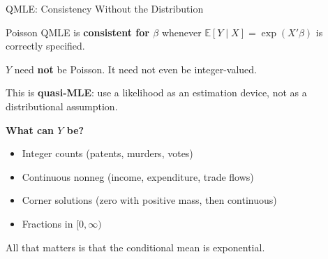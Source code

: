 \documentclass[aspectratio=169, handout, t]{beamer}
\numberwithin{equation}{section}
\begin{document}

\begin{frame}{QMLE: Consistency Without the Distribution}

\begin{tcolorbox}[colback=blue!5, colframe=blue!50, title=Key Result (Gourieroux et al.~1984; Wooldridge 2010{,} 2023)]
Poisson QMLE is \textbf{consistent for $\beta$} whenever $\mathbb{E}[Y \mid X] = \exp(X'\beta)$ is correctly specified.

\medskip

$Y$ need \textbf{not} be Poisson. It need not even be integer-valued.
\end{tcolorbox}

\pause

\bigskip

This is \textbf{quasi-MLE}: use a likelihood as an estimation device, not as a distributional assumption.

\pause

\bigskip

\textbf{What can $Y$ be?}
\begin{itemize}
    \item Integer counts (patents, murders, votes)
    \item Continuous nonneg (income, expenditure, trade flows)
    \item Corner solutions (zero with positive mass, then continuous)
    \item Fractions in $[0,\infty)$
\end{itemize}

\pause

All that matters is that the conditional mean is exponential.

\end{frame}

\end{document}
